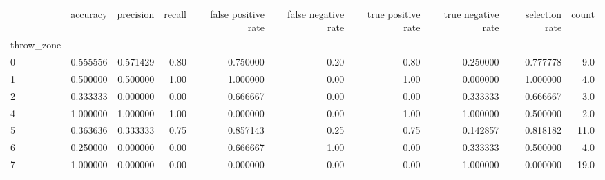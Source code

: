 \begin{tabular}{lrrrrrrrrr}
\toprule
{} &  accuracy &  precision &  recall &  false positive rate &  false negative rate &  true positive rate &  true negative rate &  selection rate &  count \\
throw\_zone &           &            &         &                      &                      &                     &                     &                 &        \\
\midrule
0          &  0.555556 &   0.571429 &    0.80 &             0.750000 &                 0.20 &                0.80 &            0.250000 &        0.777778 &    9.0 \\
1          &  0.500000 &   0.500000 &    1.00 &             1.000000 &                 0.00 &                1.00 &            0.000000 &        1.000000 &    4.0 \\
2          &  0.333333 &   0.000000 &    0.00 &             0.666667 &                 0.00 &                0.00 &            0.333333 &        0.666667 &    3.0 \\
4          &  1.000000 &   1.000000 &    1.00 &             0.000000 &                 0.00 &                1.00 &            1.000000 &        0.500000 &    2.0 \\
5          &  0.363636 &   0.333333 &    0.75 &             0.857143 &                 0.25 &                0.75 &            0.142857 &        0.818182 &   11.0 \\
6          &  0.250000 &   0.000000 &    0.00 &             0.666667 &                 1.00 &                0.00 &            0.333333 &        0.500000 &    4.0 \\
7          &  1.000000 &   0.000000 &    0.00 &             0.000000 &                 0.00 &                0.00 &            1.000000 &        0.000000 &   19.0 \\
\bottomrule
\end{tabular}
